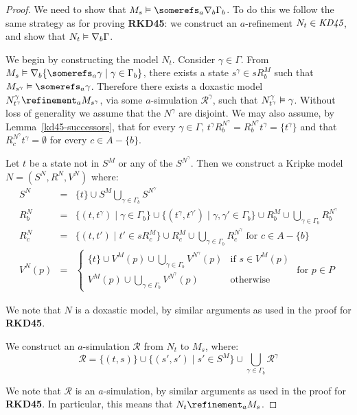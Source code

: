 \begin{proof}
We need to show that $M_s \entails \somerefs_a \covers_b \Gamma_b$. To do this
we follow the same strategy as for proving {\bf RKD45}: we construct an
$a$-refinement $N_t \in \textit{KD45}$, and show that $N_t \vDash \nabla_b
\Gamma$.

We begin by constructing the model $N_t$. Consider $\gamma \in \Gamma$. From
$M_s \entails \covers_b \{ \somerefs_a \gamma \mid \gamma \in \Gamma_b\}$, there
exists a state $s^\gamma \in sR^M_b$ such that $M_{s^\gamma} \entails
\somerefs_a \gamma$. Therefore there exists a doxastic model
$N^\gamma_{t^\gamma} \refinement_a M_{s^\gamma}$, via some $a$-simulation
$\mathcal{R}^\gamma$, such that $N^\gamma_{t^\gamma} \vDash \gamma$.  Without
loss of generality we assume that the $N^\gamma$ are disjoint. We may also
assume, by Lemma~\ref{kd45-successors}, that for every $\gamma \in \Gamma$,
$t^\gamma R^{N^\gamma}_b = R^{N^\gamma}_b t^\gamma = \{t^\gamma\}$ and that
$R^{N^\gamma}_c t^\gamma = \emptyset$ for every $c \in A - \{b\}$.

Let $t$ be a state not in $S^M$ or any of the $S^{N^\gamma}$. Then we construct
a Kripke model $N = (S^N, R^N, V^N)$ where:
\begin{eqnarray*}
S^N &=& \{t\} \cup S^M \bigcup_{\gamma \in \Gamma_b} S^{N^\gamma}\\
R^N_b &=& \{(t, t^\gamma) \mid \gamma \in \Gamma_b\} \cup \{(t^\gamma,
t^{\gamma'}) \mid \gamma, \gamma' \in \Gamma_b\} \cup R^M_b \cup \bigcup_{\gamma
\in \Gamma_b} R^{N^\gamma}_b\\
R^N_c &=& \{(t, t') \mid t' \in sR^M_c\} \cup R^M_c \cup \bigcup_{\gamma \in
\Gamma_b} R^{N^\gamma}_c \text{ for $c \in A - \{b\}$}\\
V^N(p) &=& 
\begin{cases}
\displaystyle \{t\} \cup V^M(p) \cup \bigcup_{\gamma \in \Gamma_b}
V^{N^\gamma}(p) & \text{if $s \in V^M(p)$}\\
\displaystyle V^M(p) \cup \bigcup_{\gamma \in \Gamma_b} V^{N^\gamma}(p) &
\text{otherwise}
\end{cases}
\text{ for $p \in P$}
\end{eqnarray*}

We note that $N$ is a doxastic model, by similar arguments as used in the proof
for {\bf RKD45}.

We construct an $a$-simulation $\mathcal{R}$ from $N_t$ to $M_s$, where:
$$\mathcal{R} = \{(t, s)\} \cup \{(s', s') \mid s' \in S^M\} \cup \bigcup_{\gamma \in \Gamma_b} \mathcal{R}^\gamma$$

We note that $\mathcal{R}$ is an $a$-simulation, by similar arguments as used in
the proof for {\bf RKD45}. In particular, this means that $N_t \refinement_a
M_s$.


\end{proof}
